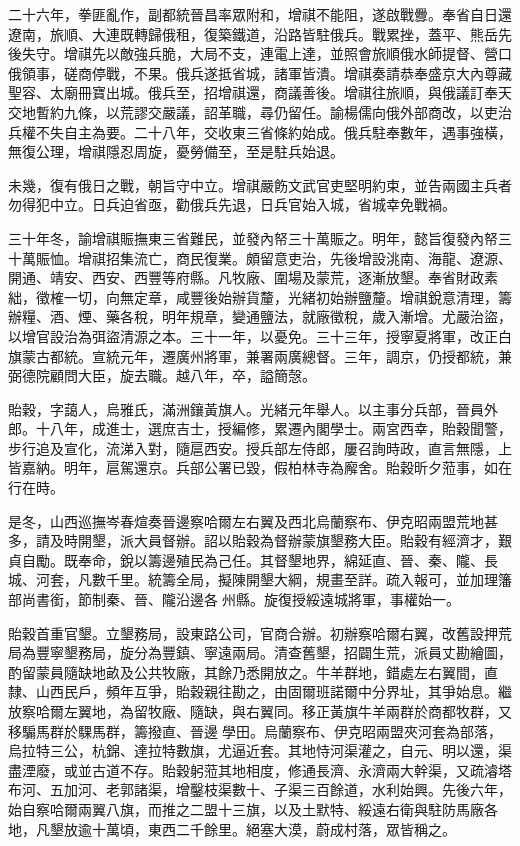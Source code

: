 \begin{pinyinscope}
二十六年，拳匪亂作，副都統晉昌率眾附和，增祺不能阻，遂啟戰釁。奉省自日還遼南，旅順、大連既轉歸俄租，復築鐵道，沿路皆駐俄兵。戰累挫，蓋平、熊岳先後失守。增祺先以敵強兵脆，大局不支，連電上達，並照會旅順俄水師提督、營口俄領事，磋商停戰，不果。俄兵遂抵省城，諸軍皆潰。增祺奏請恭奉盛京大內尊藏聖容、太廟冊寶出城。俄兵至，招增祺還，商議善後。增祺往旅順，與俄議訂奉天交地暫約九條，以荒謬交嚴議，詔革職，尋仍留任。諭楊儒向俄外部商改，以吏治兵權不失自主為要。二十八年，交收東三省條約始成。俄兵駐奉數年，遇事強橫，無復公理，增祺隱忍周旋，憂勞備至，至是駐兵始退。

未幾，復有俄日之戰，朝旨守中立。增祺嚴飭文武官吏堅明約束，並告兩國主兵者勿得犯中立。日兵迫省亟，勸俄兵先退，日兵官始入城，省城幸免戰禍。

三十年冬，諭增祺賑撫東三省難民，並發內帑三十萬賑之。明年，懿旨復發內帑三十萬賑恤。增祺招集流亡，商民復業。頗留意吏治，先後增設洮南、海龍、遼源、開通、靖安、西安、西豐等府縣。凡牧廠、圍場及蒙荒，逐漸放墾。奉省財政素絀，徵榷一切，向無定章，咸豐後始辦貨釐，光緒初始辦鹽釐。增祺銳意清理，籌辦糧、酒、煙、藥各稅，明年規章，變通鹽法，就廠徵稅，歲入漸增。尤嚴治盜，以增官設治為弭盜清源之本。三十一年，以憂免。三十三年，授寧夏將軍，改正白旗蒙古都統。宣統元年，遷廣州將軍，兼署兩廣總督。三年，調京，仍授都統，兼弼德院顧問大臣，旋去職。越八年，卒，謚簡愨。

貽穀，字藹人，烏雅氏，滿洲鑲黃旗人。光緒元年舉人。以主事分兵部，晉員外郎。十八年，成進士，選庶吉士，授編修，累遷內閣學士。兩宮西幸，貽穀聞警，步行追及宣化，流涕入對，隨扈西安。授兵部左侍郎，屢召詢時政，直言無隱，上皆嘉納。明年，扈駕還京。兵部公署已毀，假柏林寺為廨舍。貽穀昕夕蒞事，如在行在時。

是冬，山西巡撫岑春煊奏晉邊察哈爾左右翼及西北烏蘭察布、伊克昭兩盟荒地甚多，請及時開墾，派大員督辦。詔以貽穀為督辦蒙旗墾務大臣。貽穀有經濟才，艱貞自勵。既奉命，銳以籌邊殖民為己任。其督墾地界，綿延直、晉、秦、隴、長城、河套，凡數千里。統籌全局，擬陳開墾大綱，規畫至詳。疏入報可，並加理籓部尚書銜，節制秦、晉、隴沿邊各州縣。旋復授綏遠城將軍，事權始一。

貽穀首重官墾。立墾務局，設東路公司，官商合辦。初辦察哈爾右翼，改舊設押荒局為豐寧墾務局，旋分為豐鎮、寧遠兩局。清查舊墾，招闢生荒，派員丈勘繪圖，酌留蒙員隨缺地畝及公共牧廠，其餘乃悉開放之。牛羊群地，錯處左右翼間，直隸、山西民戶，頻年互爭，貽穀親往勘之，由固爾班諾爾中分界址，其爭始息。繼放察哈爾左翼地，為留牧廠、隨缺，與右翼同。移正黃旗牛羊兩群於商都牧群，又移騸馬群於騍馬群，籌撥直、晉邊學田。烏蘭察布、伊克昭兩盟夾河套為部落，烏拉特三公，杭錦、達拉特數旗，尤逼近套。其地恃河渠灌之，自元、明以還，渠盡湮廢，或並古道不存。貽穀躬蒞其地相度，修通長濟、永濟兩大幹渠，又疏濬塔布河、五加河、老郭諸渠，增鑿枝渠數十、子渠三百餘道，水利始興。先後六年，始自察哈爾兩翼八旗，而推之二盟十三旗，以及土默特、綏遠右衛與駐防馬廠各地，凡墾放逾十萬頃，東西二千餘里。絕塞大漠，蔚成村落，眾皆稱之。


\end{pinyinscope}
